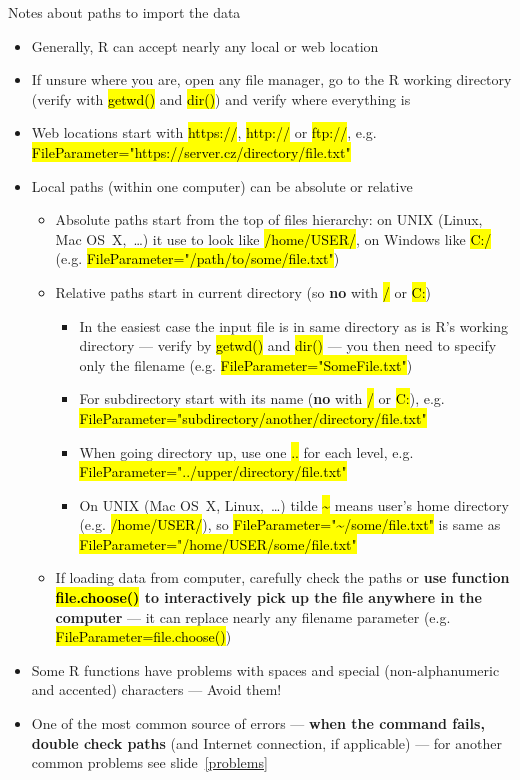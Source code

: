 \documentclass[compress, ucs, xelatex, 11pt, xcolor=svgnames,
  hyperref={
    bookmarks=true,
    unicode=true,
    colorlinks=true,
    pdftitle={Molecular data in R},
    plainpages=false,
    pdfauthor={Vojtech Zeisek},
    pdfsubject={Course about phylogeny and evolution in R},
    pdfcreator={XeLaTeX},
    pdfkeywords={R, evolution, phylogeny, molecular data},
    linkcolor=Tomato,
    anchorcolor=SaddleBrown,
    citecolor=Goldenrod,
    filecolor=DarkMagenta,
    menucolor=Sienna,
    urlcolor=DarkTurquoise,
    pdftex},
  url={hyphens, lowtilde} %
  ]{beamer}
\renewcommand{\texttt}[1]{\hl{\ttfamily #1}}
\begin{document}
\begin{frame}[allowframebreaks]{Notes about paths to import the data}
  \label{path}
  \begin{itemize}
    \item Generally, R can accept nearly any local or web location
    \item If unsure where you are, open any file manager, go to the R working directory (verify with \texttt{getwd()} and \texttt{dir()}) and verify where everything is
    \item Web locations start with \texttt{https://}, \texttt{http://} or \texttt{ftp://}, e.g. \texttt{FileParameter="https://server.cz/directory/file.txt"}
    \item Local paths (within one computer) can be absolute or relative
    \begin{itemize}
      \item Absolute paths start from the top of files hierarchy: on UNIX (Linux, Mac OS~X,~\ldots) it use to look like \texttt{/home/USER/}, on Windows like \texttt{C:/} (e.g. \texttt{FileParameter="/path/to/some/file.txt"})
      \item Relative paths start in current directory (so \textbf{no} with \texttt{/} or \texttt{C:})
      \begin{itemize}
	\item In the easiest case the input file is in same directory as is R's working directory --- verify by \texttt{getwd()} and \texttt{dir()} --- you then need to specify only the filename (e.g. \texttt{FileParameter="SomeFile.txt"})
	\item For subdirectory start with its name (\textbf{no} with \texttt{/} or \texttt{C:}), e.g. \texttt{FileParameter="subdirectory/another/directory/file.txt"}
	\item When going directory up, use one \texttt{..} for each level, e.g. \texttt{FileParameter="../upper/directory/file.txt"}
	\item On UNIX (Mac OS~X, Linux,~\ldots) tilde \texttt{\textasciitilde} means user's home directory (e.g. \texttt{/home/USER/}), so \texttt{FileParameter="\textasciitilde/some/file.txt"} is same as \texttt{FileParameter="/home/USER/some/file.txt"}
      \end{itemize}
      \item If loading data from computer, carefully check the paths or \textbf{use function \texttt{file.choose()} to interactively pick up the file anywhere in the computer} --- it can replace nearly any filename parameter (e.g. \alert{\texttt{FileParameter=file.choose()}})
    \end{itemize}
    \item Some R functions have problems with spaces and special (non-alphanumeric and accented) characters --- Avoid them!
    \item One of the most common source of errors --- \textbf{when the command fails, double check paths} (and Internet connection, if applicable) --- for another common problems see slide~\ref{problems}
  \end{itemize}
\end{frame}
\end{document}
